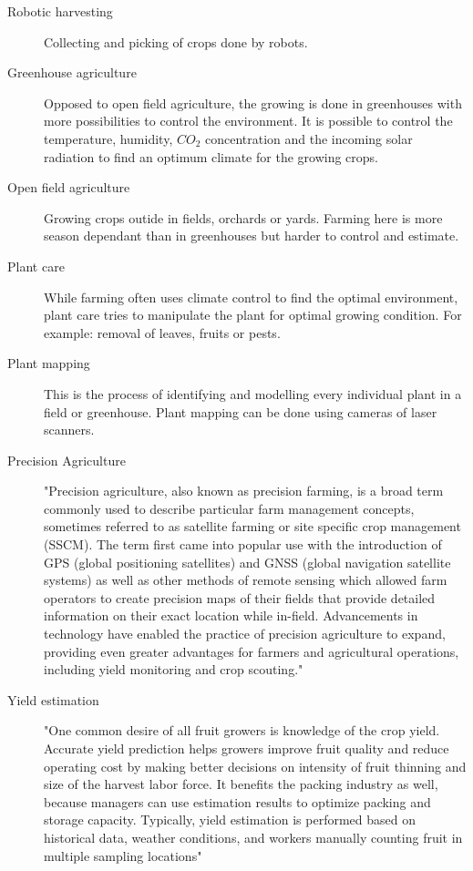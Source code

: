 \documentclass{article}
\begin{document}
\begin{description}
    \item[Robotic harvesting] Collecting and picking of crops done by robots.
    \item[Greenhouse agriculture] Opposed to open field agriculture, the growing is done in greenhouses with more possibilities to control the environment. It is possible to control the temperature, humidity, $CO_2$ concentration and the incoming solar radiation to find an optimum climate for the growing crops.
    \item[Open field agriculture] Growing crops outide in fields, orchards or yards. Farming here is more season dependant than in greenhouses but harder to control and estimate.
    \item[Plant care] While farming often uses climate control to find the optimal environment, plant care tries to manipulate the plant for optimal growing condition. For example: removal of leaves, fruits or pests.
    \item[Plant mapping] This is the process of identifying and modelling every individual plant in a field or greenhouse. Plant mapping can be done using cameras of laser scanners. 
    \item[Precision Agriculture] "Precision agriculture, also known as precision farming, is a broad term commonly used to describe particular farm management concepts, sometimes referred to as satellite farming or site specific crop management (SSCM). The term first came into popular use with the introduction of GPS (global positioning satellites) and GNSS (global navigation satellite systems) as well as other methods of remote sensing which allowed farm operators to create precision maps of their fields that provide detailed information on their exact location while in-field. Advancements in technology have enabled the practice of precision agriculture to expand, providing even greater advantages for farmers and agricultural operations, including yield monitoring and crop scouting." \cite{Farms2020}
    \item[Yield estimation] "One common desire of all fruit growers is knowledge of the crop yield. Accurate yield prediction helps growers improve fruit quality and reduce operating cost by making better decisions on intensity of fruit thinning and size of the harvest labor force. It benefits the packing industry as well, because managers can use estimation results to optimize packing and storage capacity. Typically, yield estimation is performed based on historical data, weather conditions, and workers manually counting fruit in multiple sampling locations" \cite{Siciliano2016}

\end{description}
\end{document}
